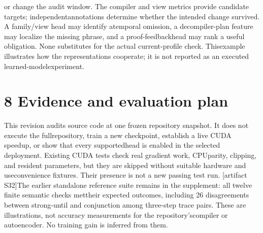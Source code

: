 or change the audit window. The compiler and view metrics provide candidate targets; independent\linebreak[4]
annotations determine whether the intended change survived. A family/view head may identify a\linebreak[4]
temporal omission, a decompiler-plan feature may localize the missing phrase, and a proof-feedback\linebreak[4]
head may rank a useful obligation. None substitutes for the actual current-profile check. This\linebreak[4]
example illustrates how the representations cooperate; it is not reported as an executed learned-model\linebreak[4]
experiment.\par

\section*{8  Evidence and evaluation plan}
\noindent
This revision audits source code at one frozen repository snapshot. It does not execute the full\linebreak[4]
repository, train a new checkpoint, establish a live CUDA speedup, or show that every supported\linebreak[4]
head is enabled in the selected deployment. Existing CUDA tests check real gradient work, CPU\linebreak[4]
parity, clipping, and resident parameters, but they are skipped without suitable hardware and use\linebreak[4]
convenience fixtures. Their presence is not a new passing test run. [artifact S32]\linebreak[4]
The earlier standalone reference suite remains in the supplement: all twelve finite semantic checks met\linebreak[4]
their expected outcomes, including 26 disagreements between strong-until and conjunction among three-step trace pairs. These are illustrations, not accuracy measurements for the repository's\linebreak[4]
compiler or autoencoder. No training gain is inferred from them.\par

